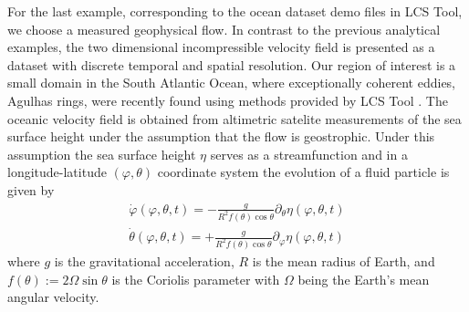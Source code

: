 \documentclass{article}
\begin{document}
For the last example, corresponding to the ocean dataset demo files in LCS Tool, we choose a measured geophysical flow. In contrast to the previous analytical examples, the two dimensional incompressible velocity field is presented as a dataset with discrete temporal and spatial resolution. Our region of interest is a small domain in the South Atlantic Ocean, where exceptionally coherent eddies, Agulhas rings, were recently found using methods provided by LCS Tool \parencite{haller13:_coher_lagran}. The oceanic velocity field is obtained from altimetric satelite measurements of the sea surface height under the assumption that the flow is geostrophic. Under this assumption the sea surface height $\eta$ serves as a streamfunction and in a longitude-latitude $(\varphi,\theta)$ coordinate system the evolution of a fluid particle is given by
\begin{eqnarray}
\dot{\varphi}(\varphi,\theta,t) = -\frac{g}{R^2 f(\theta) \cos\theta}\partial_{\theta}\eta(\varphi,\theta,t)\label{eq:dtlon}\\
\dot{\theta}(\varphi,\theta,t) = +\frac{g}{R^2 f(\theta) \cos\theta}\partial_{\varphi}\eta(\varphi,\theta,t)
\label{eq:dtlat}
\end{eqnarray}
where $g$ is the gravitational acceleration, $R$ is the mean radius of Earth, and $f(\theta):=2\Omega\sin\theta$ is the Coriolis parameter with $\Omega$ being the Earth's mean angular velocity. 
\end{document}
